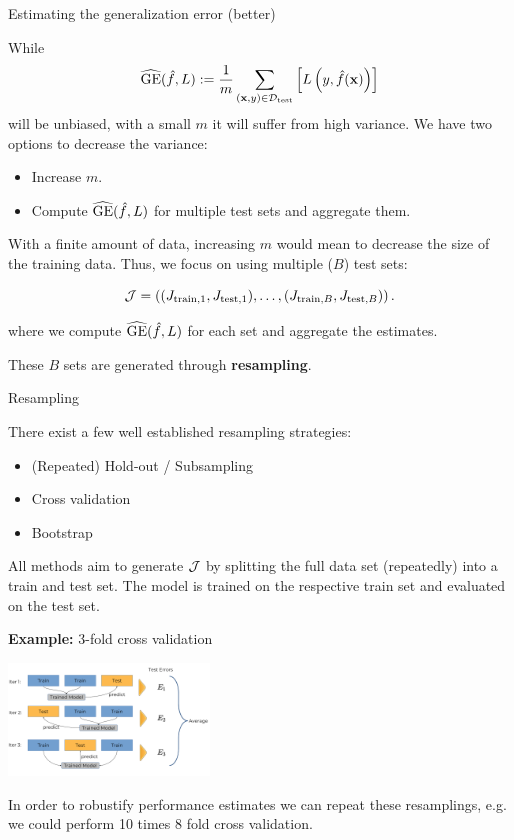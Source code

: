 \documentclass[11pt,compress,t,notes=noshow, xcolor=table]{beamer}
\begin{document}
\begin{vbframe}{Estimating the generalization error (better)}

While  $$\widehat{\mathrm{GE}}(\hat{f}, L) := \frac{1}{m}\sum_{(\mathbf{x}, y) \in \mathcal{D}_{\text{test}}} \left[ L\left(y, \hat{f}(\mathbf{x})\right) \right]$$ will be unbiased, with a small $m$ it will suffer from high variance.
We have two options to decrease the variance:

\begin{itemize}
\item Increase $m$.
\item Compute $\widehat{\mathrm{GE}}(\hat{f}, L)$ for multiple test sets and aggregate them.
\end{itemize}

With a finite amount of data, increasing $m$ would mean to decrease the size of the training data.
Thus, we focus on using multiple ($B$) test sets: 

$$\mathcal{J} = \left((J_{\mathrm{train},1}, J_{\mathrm{test},1}),\dots,(J_{\mathrm{train},B}, J_{\mathrm{test},B})\right).$$

where we compute $\widehat{\mathrm{GE}}(\hat{f}, L)$ for each set and aggregate the estimates.

These $B$ sets are generated through \textbf{resampling}.


\end{vbframe}

\begin{vbframe}{Resampling}

There exist a few well established resampling strategies:

\begin{itemize}
\item (Repeated) Hold-out / Subsampling
\item Cross validation
\item Bootstrap
\end{itemize}

All methods aim to generate $\mathcal{J}$ by splitting the full data set (repeatedly) into a train and test set.
The model is trained on the respective train set and evaluated on the test set.

\textbf{Example:} 3-fold cross validation

\begin{center}
\includegraphics[width=0.4\textwidth]{figure_man/crossvalidation.png}
\end{center}


In order to robustify performance estimates we can repeat these resamplings, e.g. we could perform 10 times 8 fold cross validation.

\end{vbframe}





\endlecture
\end{document}

